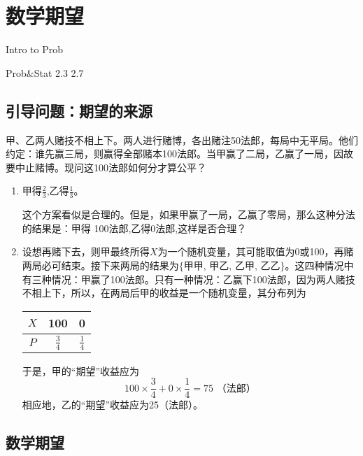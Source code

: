 \chapter{数学期望}
\begin{introduction}
  \item Intro to Prob
  \item Prob$\&$Stat 2.3 2.7
\end{introduction}
\section{引导问题：期望的来源}
\begin{instance}[（分赌本问题）]
甲、乙两人赌技不相上下。两人进行赌博，各出赌注50法郎，每局中无平局。他们约定：谁先赢三局，则赢得全部赌本100法郎。当甲赢了二局，乙赢了一局，因故要中止赌博。现问这100法郎如何分才算公平？

\begin{enumerate}
\item 甲得$\frac{2}{3}$,乙得$\frac{1}{3}$。

这个方案看似是合理的。但是，如果甲赢了一局，乙赢了零局，那么这种分法的结果是：甲得 100法郎,乙得0法郎,这样是否合理？
\item 设想再赌下去，则甲最终所得$X$为一个随机变量，其可能取值为0或100，再赌两局必可结束。接下来两局的结果为$\{\text{甲甲, 甲乙, 乙甲, 乙乙}\}$。这四种情况中有三种情况：甲赢了100法郎。只有一种情况：乙赢下100法郎，因为两人赌技不相上下，所以，在两局后甲的收益是一个随机变量，其分布列为
 \begin{table}[h]
        \centering
\begin{tabular}{c|cc}
$X$ & 100           & 0             \\ \hline
$P$ & $\frac{3}{4}$ & $\frac{1}{4}$
\end{tabular}
\end{table}

于是，甲的“期望”收益应为
$$
100\times \frac{3}{4} + 0 \times \frac{1}{4} = 75\text{ （法郎）}
$$
相应地，乙的“期望”收益应为25（法郎）。
\end{enumerate}    
\end{instance}



\section{数学期望}


